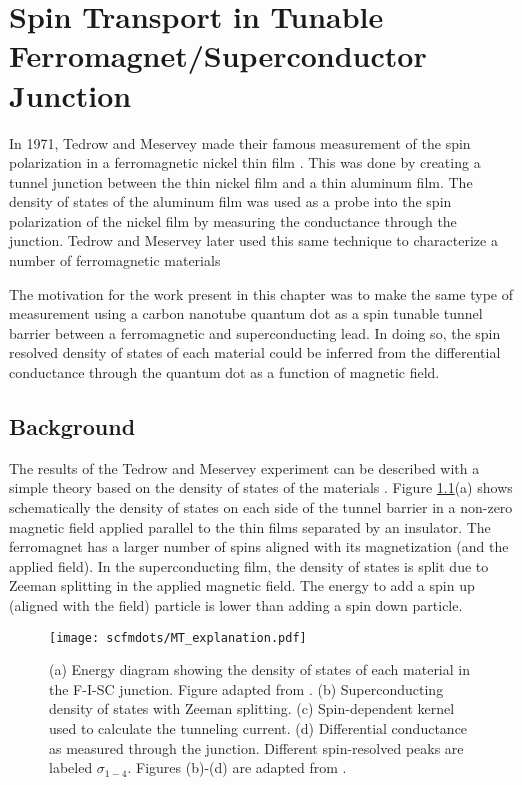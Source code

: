 \chapter{Spin Transport in Tunable Ferromagnet/Superconductor Junction}
\label{sec:SCFM}


In 1971, Tedrow and Meservey made their famous measurement of the spin polarization in a ferromagnetic nickel thin film \cite{Tedrow1971}. This was done by creating a tunnel junction between the thin nickel film and a thin aluminum film. The density of states of the aluminum film was used as a probe into the spin polarization of the nickel film by measuring the conductance through the junction. Tedrow and Meservey later used this same technique to characterize a number of ferromagnetic materials \cite{Tedrow1973}

The motivation for the work present in this chapter was to make the same type of measurement using a carbon nanotube quantum dot as a spin tunable tunnel barrier between a ferromagnetic and superconducting lead. In doing so, the spin resolved density of states of each material could be inferred from the differential conductance through the quantum dot as a function of magnetic field.

\section{Background}

The results of the Tedrow and Meservey experiment can be described with a simple theory based on the density of states of the materials \cite{Meservey1994}. Figure \ref{fig:MT_explanation}(a) shows schematically the density of states on each side of the tunnel barrier in a non-zero magnetic field applied parallel to the thin films separated by an insulator. The ferromagnet has a larger number of spins aligned with its magnetization (and the applied field). In the superconducting film, the density of states is split due to Zeeman splitting in the applied magnetic field. The energy to add a spin up (aligned with the field) particle is lower than adding a spin down particle. 

\begin{figure}
    \centering
    \texttt{[image: scfmdots/MT\_explanation.pdf]}
    \caption{(a) Energy diagram showing the density of states of each material in the F-I-SC junction. Figure adapted from \cite{Moodera2010}. (b) Superconducting density of states with Zeeman splitting. (c) Spin-dependent kernel used to calculate the tunneling current. (d) Differential conductance as measured through the junction. Different spin-resolved peaks are labeled $\sigma_{1-4}$. Figures (b)-(d) are adapted from \cite{Meservey1994}.}
    \label{fig:MT_explanation}
\end{figure}

